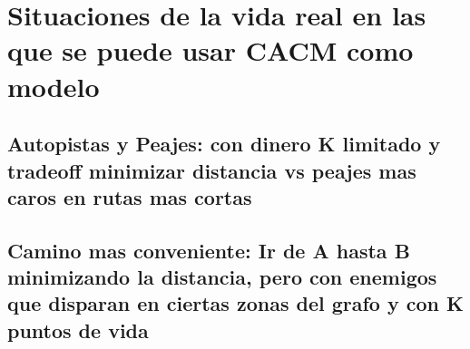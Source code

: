 \section{Situaciones de la vida real en las que se puede usar CACM como modelo}
\subsection{Autopistas y Peajes: con dinero K limitado y tradeoff minimizar distancia vs peajes mas caros en rutas mas cortas}
\subsection{Camino mas conveniente: Ir de A hasta B minimizando la distancia, pero con enemigos que disparan en ciertas zonas del grafo y con K puntos de vida}